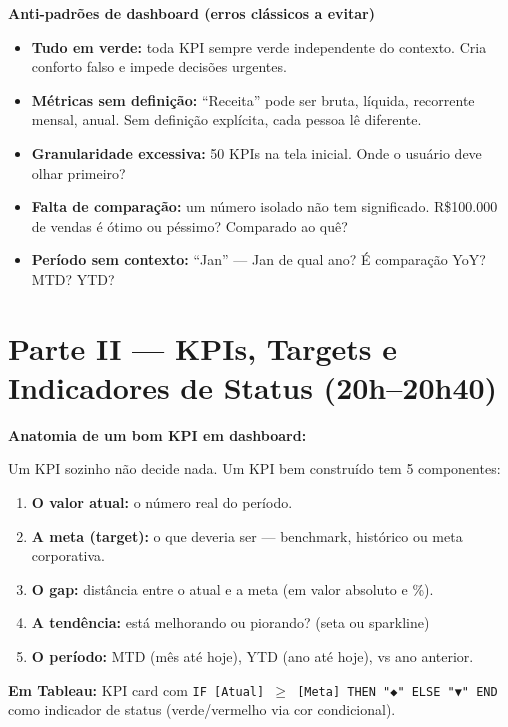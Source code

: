 \begin{BoardBox}
\textbf{Anti-padrões de dashboard (erros clássicos a evitar)}
\begin{itemize}
  \item \textbf{Tudo em verde:} toda KPI sempre verde independente do contexto.
  Cria conforto falso e impede decisões urgentes.
  \item \textbf{Métricas sem definição:} ``Receita'' pode ser bruta, líquida,
  recorrente mensal, anual. Sem definição explícita, cada pessoa lê diferente.
  \item \textbf{Granularidade excessiva:} 50 KPIs na tela inicial. Onde o usuário
  deve olhar primeiro?
  \item \textbf{Falta de comparação:} um número isolado não tem significado.
  R\$100.000 de vendas é ótimo ou péssimo? Comparado ao quê?
  \item \textbf{Período sem contexto:} ``Jan'' — Jan de qual ano? É comparação YoY?
  MTD? YTD?
\end{itemize}
\end{BoardBox}

\section{Parte II — KPIs, Targets e Indicadores de Status (20h–20h40)}

\begin{SolvedBox}
\textbf{Anatomia de um bom KPI em dashboard:}

Um KPI sozinho não decide nada. Um KPI bem construído tem 5 componentes:
\begin{enumerate}
  \item \textbf{O valor atual:} o número real do período.
  \item \textbf{A meta (target):} o que deveria ser — benchmark, histórico ou meta corporativa.
  \item \textbf{O gap:} distância entre o atual e a meta (em valor absoluto e \%).
  \item \textbf{A tendência:} está melhorando ou piorando? (seta ou sparkline)
  \item \textbf{O período:} MTD (mês até hoje), YTD (ano até hoje), vs ano anterior.
\end{enumerate}

\textbf{Em Tableau:} KPI card com \texttt{IF [Atual] $\geq$ [Meta] THEN "\texttt{◆}" ELSE "\texttt{▼}" END}
como indicador de status (verde/vermelho via cor condicional).
\end{SolvedBox}


